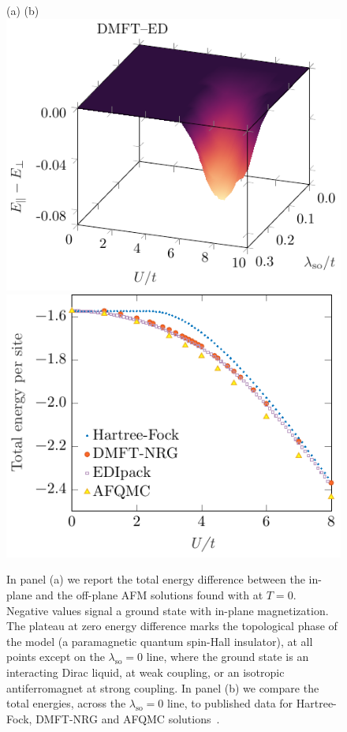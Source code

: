 \documentclass[edipack_sp.tex]{subfiles}
\begin{document}
\begin{figure}
\hspace{1cm} (a) \hspace{6.5cm} (b)\\
    \includegraphics[width=0.47\linewidth,trim={0 0 0 5mm},clip]{figures/KMH_energy.pdf}\hfill
    \includegraphics[width=0.45\linewidth]{figures/benchEnergy_honey.pdf}\\
    \caption{In panel (a) we report the total energy difference between 
    the in-plane and the
    off-plane AFM solutions found with \NAME at $T=0$. Negative values
    signal a ground state with in-plane magnetization. The plateau at zero
    energy difference marks the topological phase of the model (a 
    paramagnetic quantum spin-Hall insulator), at all points except on the $\lambda_\mathrm{so}=0$ line, where the ground state is an interacting
    Dirac liquid, at weak coupling, or an isotropic antiferromagnet at strong coupling. In panel (b) we compare the total energies, across the 
    $\lambda_\mathrm{so}=0$ line, to published data for Hartree-Fock,
    DMFT-NRG and AFQMC solutions~\cite{Raczkowski2020PRB}.}
    \label{fig:KMenergy}
\end{figure}
\end{document}
